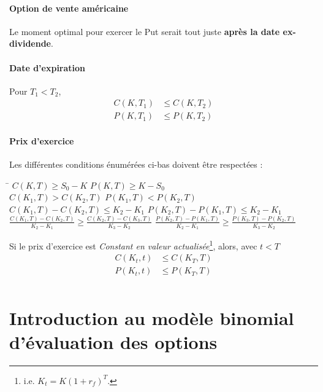 \documentclass[10pt, french]{article}
\begin{document}
\begin{multicols*}{2}
\paragraph{Option de vente américaine}
Le moment optimal pour exercer le Put serait tout juste \textbf{après la date ex-dividende}.



\paragraph{Date d'expiration}
Pour $T_1 < T_2$,
\begin{align*}
C(K, T_1) & \leq C(K, T_2) \\
P(K, T_1) & \leq P(K, T_2)
\end{align*}


\paragraph{Prix d'exercice}
Les différentes conditions énumérées ci-bas doivent être respectées :
\begin{tabbing}
\hspace{5cm}\=\kill
 $C(K,T) \geq S_0 - K$ \>  $ P(K,T) \geq K - S_0$ \\
  $C(K_1, T) > C(K_2, T)$ \> $P(K_1, T) < P(K_2, T)$ \\
 $C(K_1, T) - C(K_2, T) \leq K_2 - K_1$ \> $P(K_2, T) - P(K_1, T) \leq K_2 - K_1$ \\
 $\frac{C(K_1, T) - C(K_2, T)}{K_2 - K_1} \geq \frac{C(K_2, T) - C(K_3, T)}{K_3 - K_2}$ \>  $\frac{P(K_2, T) - P(K_1, T)}{K_2 - K_1} \geq \frac{P(K_3, T) - P(K_2, T)}{K_3 - K_2}$ \\
\end{tabbing}
Si le prix d'exercice est \textit{Constant en valeur actualisée}\footnote{i.e. $K_t = K(1+r_f)^{T}$.}, alors, avec $t < T$
\begin{align*}
C(K_t, t) & \leq C(K_T, T) \\
P(K_t, t) & \leq P(K_T, T) \\
\end{align*}

\section{Introduction au modèle binomial d'évaluation des options}

\end{multicols*}
\end{document}
